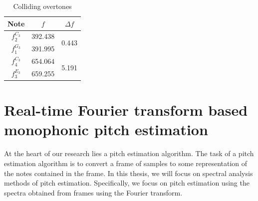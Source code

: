 \documentclass[10pt,twocolumn]{article}
\begin{document}
\begin{table}[H]
    \centering
    \begin{tabular}{c|c|c}
        Note & $f$ & $\Delta f$ \\
        \hline
        $f^{C_3}_2$ & 392.438 & \multirow{2}{*}{0.443} \\
        $f^{G_3}_1$ & 391.995 & \\
        \hline
        $f^{C_3}_4$ & 654.064 & \multirow{2}{*}{5.191} \\
        $f^{E_3}_3$ & 659.255 &
    \end{tabular}
    \caption{Colliding overtones}
    \label{tab:diff}
\end{table}


\section{Real-time Fourier transform based monophonic pitch estimation}
At the heart of our research lies a pitch estimation algorithm. The task of a pitch estimation algorithm is to convert a frame of samples to some representation of the notes contained in the frame. In this thesis, we will focus on spectral analysis methods of pitch estimation. Specifically, we focus on pitch estimation using the spectra obtained from frames using the Fourier transform.




\end{document}
